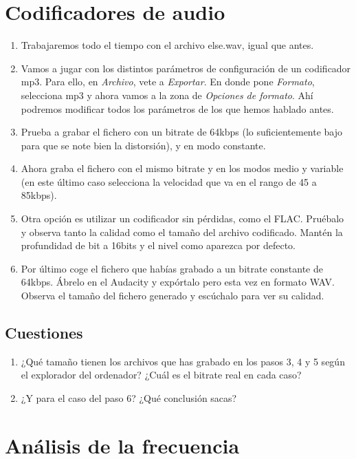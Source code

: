\documentclass[es,practica]{uah}
\begin{document}
\section{Codificadores de audio}

\begin{enumerate}

\item Trabajaremos todo el tiempo con el archivo else.wav, igual que antes. 
\item Vamos a jugar con los distintos parámetros de configuración de un codificador mp3. Para ello, en {\em Archivo}, vete a {\em Exportar}. En donde pone {\em Formato}, selecciona mp3 y ahora vamos a la zona de {\em Opciones de formato}. Ahí podremos modificar todos los parámetros de los que hemos hablado antes. 
\item Prueba a grabar el fichero con un bitrate de 64kbps (lo suficientemente bajo para que se note bien la distorsión), y en modo constante.
\item Ahora graba el fichero con el mismo bitrate y en los modos medio y variable (en este último caso selecciona la velocidad que va en el rango de 45 a 85kbps).
\item Otra opción es utilizar un codificador sin pérdidas, como el FLAC. Pruébalo y observa tanto la calidad como el tamaño del archivo codificado. Mantén la profundidad de bit a 16bits y el nivel como aparezca por defecto. 
\item Por último coge el fichero que habías grabado a un bitrate constante de 64kbps. Ábrelo en el Audacity y expórtalo pero esta vez en formato WAV. Observa el tamaño del fichero generado y escúchalo para ver su calidad. 
 
\end{enumerate}

\subsection{Cuestiones}
\begin{enumerate}
\item ¿Qué tamaño tienen los archivos que has grabado en los pasos 3, 4 y 5 según el explorador del ordenador? ¿Cuál es el bitrate real en cada caso?
\item ¿Y para el caso del paso 6? ¿Qué conclusión sacas?
\end{enumerate}

\section{Análisis de la frecuencia}
\end{document}
